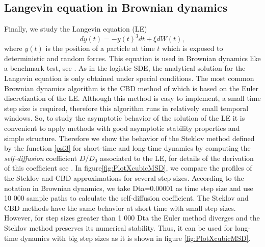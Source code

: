 	\subsection{Langevin equation in Brownian dynamics}\label{sec52}
	Finally, we study the Langevin equation (LE)
	\begin{equation*}
		dy(t)= -y(t)^3dt+
		\xi dW(t), 
	\end{equation*}
		where $y(t)$ is the position of a particle at time $t$ which is exposed to
	deterministic and random forces. This   equation is used in Brownian dynamics like a
	benchmark test, see \cite{Braanka1998}.  As in the logistic SDE, the analytical solution
	for the Langevin equation is only obtained under special conditions. The most common
	Brownian dynamics algorithm  is the CBD method of \citet*{Ermak1978}
	which is based on the Euler discretization of the LE. Although this method is easy to
	implement, a small time step size is required, therefore this algorithm  runs in
	relatively small temporal windows. So, to study the  asymptotic behavior of the solution
	of the LE it is convenient to apply methods with good asymptotic stability properties
	and simple structure. Therefore we show the behavior of the Steklov  method defined by
	the function \eqref{psi3} for short-time and long-time dynamics by  computing  the {\it
	self-diffusion} coefficient $D/D_0$ associated to the LE, for details of the derivation
	of this coefficient see  \cite{Braanka1998, Lowen1993}. In
	figure\ref{fig:PlotXcubicMSD}, we compare the profiles of the Steklov and
	CBD approximations for several step sizes. According to the notation in Brownian
	dynamics, we take Dta=0.00001 as time step size and use 10 000 sample paths to calculate
	the self-diffusion coefficient. The Steklov and  CBD methods have the same behavior at
	short time with small step sizes. However, for step sizes greater than 1 000 Dta the
	Euler method diverges and the Steklov method preserves its numerical stability. Thus, it
	can be used for long-time dynamics with  big step sizes as it is shown in  figure
	\ref{fig:PlotXcubicMSD}.
